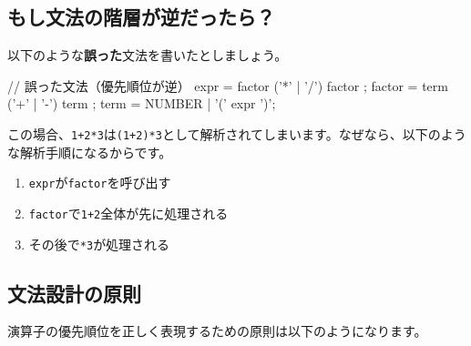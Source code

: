 \begin{center}
\end{center}
\vspace{-2mm}
\subsection{もし文法の階層が逆だったら？}

以下のような\textbf{誤った}文法を書いたとしましょう。

\begin{codescreen}{}
// 誤った文法（優先順位が逆）
expr = factor { ('*' | '/') factor };
factor = term { ('+' | '-') term };
term = NUMBER | '(' expr ')';
\end{codescreen}

この場合、\texttt{1+2*3}は\texttt{(1+2)*3}として解析されてしまいます。なぜなら、以下のような解析手順になるからです。

\begin{enumerate}
\item
 \texttt{expr}が\texttt{factor}を呼び出す
\item
  \texttt{factor}で\texttt{1+2}全体が先に処理される
\item
  その後で\texttt{*3}が処理される
\end{enumerate}

\subsection{文法設計の原則}

演算子の優先順位を正しく表現するための原則は以下のようになります。

